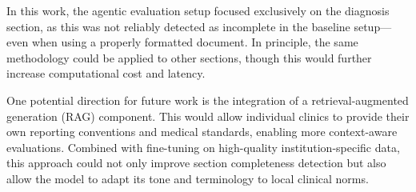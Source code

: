 In this work, the agentic evaluation setup focused exclusively on the diagnosis section, as this was not reliably detected as incomplete in the baseline setup—even when using a properly formatted document. In principle, the same methodology could be applied to other sections, though this would further increase computational cost and latency.

One potential direction for future work is the integration of a
retrieval-augmented generation (RAG) component. This would allow individual
clinics to provide their own reporting conventions and medical standards,
enabling more context-aware evaluations.\cite{p4} Combined with fine-tuning on high-quality institution-specific data, this approach could not only improve section completeness detection but also allow the model to adapt its tone and terminology to local clinical norms.

